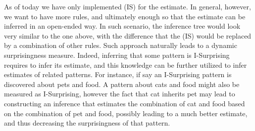 \documentclass[runningheads]{llncs}
\begin{document}
As of today we have only implemented (IS) for the estimate. In
general, however, we want to have more rules, and ultimately enough so
that the estimate can be inferred in an open-ended way. In such
scenario, the inference tree would look very similar to the one above,
with the difference that the (IS) would be replaced by a combination
of other rules. Such approach naturally leads to a dynamic
surprisingness measure. Indeed, inferring that some pattern is
I-Surprising requires to infer its estimate, and this knowledge can be
further utilized to infer estimates of related patterns. For instance,
if say an I-Surprising pattern is discovered about pets and food. A
pattern about cats and food might also be measured as I-Surprising,
however the fact that cat inherits pet may lead to constructing an
inference that estimates the combination of cat and food based on the
combination of pet and food, possibly leading to a much better
estimate, and thus decreasing the surprisingness of that pattern.








\end{document}
